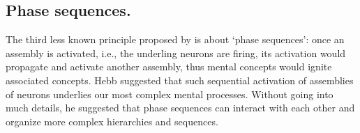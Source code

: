 



  





 

  \subsection{Phase sequences.}
    The third less known principle proposed by \cite{Hebb49} is about `phase
    sequences': once an assembly is activated, i.e., the underling neurons are
    firing, its activation would propagate and activate another assembly, thus
    mental concepts would ignite associated concepts. Hebb suggested that such
    sequential activation of assemblies of neurons underlies our most complex
    mental processes. Without going into much details, he suggested that phase
    sequences can interact with each other and organize more complex
    hierarchies and sequences. 

